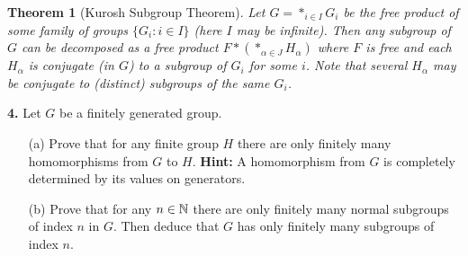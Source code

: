 \documentclass[12pt]{amsart}
\newtheorem* {Theorem}    {Theorem}
\begin{document}
\begin{Theorem}[Kurosh Subgroup Theorem] Let $G=\ast_{i\in I} G_{i}$ be the free product of some
family of groups $\{G_{i}: i\in I\}$ (here $I$ may be infinite). Then any subgroup of
$G$ can be decomposed as a free product $F\ast(\ast_{\alpha\in J} H_{\alpha})$ where $F$ is free and
each $H_{\alpha}$ is conjugate (in $G$) to a subgroup of $G_{i}$ for some $i$. Note that several
$H_{\alpha}$ may be conjugate to (distinct) subgroups of the same $G_i$.
\end{Theorem}


{\bf 4.} %
Let $G$ be a finitely generated group.
\begin{itemize}
\item[(a)] Prove that for any finite group $H$ there are only finitely many homomorphisms 
from $G$ to $H$. {\bf Hint:} A homomorphism from $G$ is completely determined by its values 
on generators.
\item[(b)] Prove that for any $n\in{\mathbb N}$ there are only finitely many normal subgroups 
of index $n$ in $G$. Then deduce that $G$ has only finitely many subgroups of index $n$.
\end{itemize}
\end{document}
